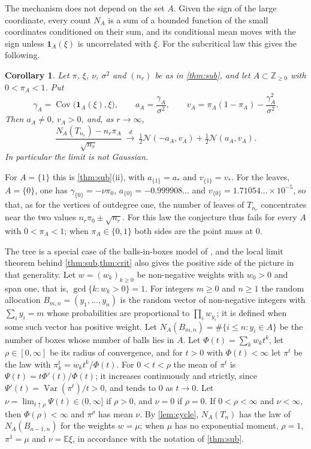 \documentclass[11pt]{amsart}
\newtheorem{corollary}[theorem]{Corollary}
\theoremstyle{definition}
\newcommand{\Z}{\mathbb{Z}}
\newcommand{\E}{\mathbb{E}}
\newcommand{\Nor}{\mathcal{N}}
\newcommand{\Ind}{\mathbf{1}}
\DeclareMathOperator{\Var}{Var}
\DeclareMathOperator{\Cov}{Cov}
\begin{document}
The mechanism does not depend on the set $A$. Given the sign of the large coordinate, every count $N_A$ is a sum of a bounded function of the small coordinates conditioned on their sum, and its conditional mean moves with the sign unless $\Ind_A(\xi)$ is uncorrelated with $\xi$. For the subcritical law this gives the following.

\begin{corollary}\label{cor:sub}
Let $\pi$, $\xi$, $\nu$, $\sigma^2$ and $(n_r)$ be as in \cref{thm:sub}, and let $A\subset\Z_{\ge0}$ with $0<\pi_A<1$. Put
\[
\gamma_A=\Cov\big(\Ind_A(\xi),\xi\big),\qquad a_A=\frac{\gamma_A}{\sigma^2},\qquad v_A=\pi_A(1-\pi_A)-\frac{\gamma_A^2}{\sigma^2}.
\]
Then $a_A\ne0$, $v_A>0$, and, as $r\to\infty$,
\[
\frac{N_A(T_{n_r})-n_r\pi_A}{\sqrt{n_r}}\ \xrightarrow{d}\ \tfrac12\Nor(-a_A,v_A)+\tfrac12\Nor(a_A,v_A).
\]
In particular the limit is not Gaussian.
\end{corollary}

For $A=\{1\}$ this is \cref{thm:sub}(ii), with $a_{\{1\}}=a_*$ and $v_{\{1\}}=v_*$. For the leaves, $A=\{0\}$, one has $\gamma_{\{0\}}=-\nu\pi_0$, $a_{\{0\}}=-0.999908\ldots$ and $v_{\{0\}}=1.71054\ldots\times10^{-5}$, so that, as for the vertices of outdegree one, the number of leaves of $T_{n_r}$ concentrates near the two values $n_r\pi_0\pm\sqrt{n_r}$. For this law the conjecture thus fails for every $A$ with $0<\pi_A<1$; when $\pi_A\in\{0,1\}$ both sides are the point mass at $0$.

The tree is a special case of the balls-in-boxes model of \cite[Section 11]{Janson12}, and the local limit theorem behind \cref{thm:sub,thm:crit} also gives the positive side of the picture in that generality. Let $w=(w_k)_{k\ge0}$ be non-negative weights with $w_0>0$ and span one, that is, $\gcd\{k:w_k>0\}=1$. For integers $m\ge0$ and $n\ge1$ the random allocation $B_{m,n}=(y_1,\dots,y_n)$ is the random vector of non-negative integers with $\sum_iy_i=m$ whose probabilities are proportional to $\prod_iw_{y_i}$; it is defined when some such vector has positive weight. Let $N_A(B_{m,n})=\#\{i\le n:y_i\in A\}$ be the number of boxes whose number of balls lies in $A$. Let $\Phi(t)=\sum_kw_kt^k$, let $\rho\in[0,\infty]$ be its radius of convergence, and for $t>0$ with $\Phi(t)<\infty$ let $\pi^t$ be the law with $\pi^t_k=w_kt^k/\Phi(t)$. For $0<t<\rho$ the mean of $\pi^t$ is $\Psi(t)=t\Phi'(t)/\Phi(t)$; it increases continuously and strictly, since $\Psi'(t)=\Var(\pi^t)/t>0$, and tends to $0$ as $t\to0$. Let $\nu=\lim_{t\uparrow\rho}\Psi(t)\in(0,\infty]$ if $\rho>0$, and $\nu=0$ if $\rho=0$. If $0<\rho<\infty$ and $\nu<\infty$, then $\Phi(\rho)<\infty$ \cite[Lemma 3.1]{Janson12} and $\pi^\rho$ has mean $\nu$. By \cref{lem:cycle}, $N_A(T_n)$ has the law of $N_A(B_{n-1,n})$ for the weights $w=\mu$; when $\mu$ has no exponential moment, $\rho=1$, $\pi^1=\mu$ and $\nu=\E\xi$, in accordance with the notation of \cref{thm:sub}.
\end{document}
